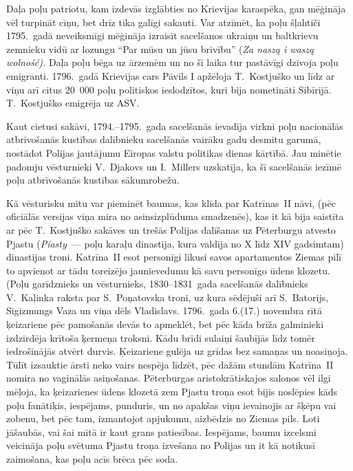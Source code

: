 \documentclass[twoside,a5paper,12pt,fleqn,openany]{extbook}
\newcommand{\pltxti}[1]{\textit{\textpolish{#1}}}
\begin{document}
Daļa poļu patriotu, kam izdevās izglābties no Krievijas karaspēka, gan mēģināja vēl turpināt cīņu, bet drīz tika galīgi sakauti. Var atzīmēt, ka poļu šļahtiči 1795.~gadā neveiksmīgi mēģināja izraisīt sacelšanos ukraiņu un baltkrievu zemnieku vidū ar lozungu ``Par mūsu un jūsu brīvību'' (\pltxti{Za naszą i waszą wolność).} Daļa poļu bēga uz ārzemēm un no šī laika tur pastāvīgi dzīvoja poļu emigranti. 1796.~gadā Krievijas cars Pāvils I apžēloja T.~Kostjuško un līdz ar viņu arī citus 20~000 poļu politiskos ieslodzītos, kuri bija nometināti Sibīrijā. T.~Kostjuško emigrēja uz ASV.

Kaut cietusi sakāvi, 1794.--1795.~gada sacelšanās ievadīja virkni poļu nacionālās atbrīvošanās kustības dalībnieku sacelšanās vairāku gadu desmitu garumā, nostādot Polijas jautājumu Eiropas valstu politikas dienas kārtībā. Jau minētie padomju vēsturnieki V.~Djakovs un I.~Millers uzskatīja, ka šī sacelšanās iezīmē poļu atbrīvošanās kustības sākumrobežu.

Kā vēsturisku mītu var pieminēt baumas, kas klīda par Katrīnas~II nāvi, (pēc oficiālās versijas viņa mira no asinsizplūduma smadzenēs), kas it kā bija saistīta ar pēc T.~Kostjuško sakāves un trešās Polijas dalīšanas uz Pēterburgu atvesto Pjastu (\pltxti{Piasty}~--- poļu karaļu dinastija, kura valdīja no X līdz XIV gadsimtam) dinastijas troni. Katrīna~II esot personīgi likusi savos apartamentos Ziemas pilī to apvienot ar tādu toreizējo jaunievedumu kā savu personīgo ūdens klozetu. (Poļu garīdznieks un vēsturnieks, 1830--1831~gada sacelšanās dalībnieks V.~Kaļinka raksta par S.~Poņatovska troni, uz kura sēdējuši arī S.~Batorijs, Sigizmungs Vaza un viņa dēls Vladislavs. 1796.~gada 6.(17.) novembra rītā ķeizariene pēc pamošanās devās to apmeklēt, bet pēc kāda brīža galminieki izdzirdēja krītoša ķermeņa troksni. Kādu brīdi sulaiņi šaubījās līdz tomēr iedrošinājās atvērt durvis. Ķeizariene gulēja uz grīdas bez samaņas un noasiņoja. Tūlīt izsauktie ārsti neko vairs nespēja līdzēt, pēc dažām stundām Katrīna~II nomira no vaginālās asiņošanas. Pēterburgas aristokrātiskajos salonos vēl ilgi mēļoja, ka ķeizarienes ūdens klozetā zem Pjastu troņa esot bijis noslēpies kāds poļu fanātiķis, iespējams, punduris, un no apakšas viņu ievainojis ar šķēpu vai zobenu, bet pēc tam, izmantojot apjukumu, aizbēdzis no Ziemas pils. Loti jāšaubās, vai šai mītā ir kaut grans patiesības. Iespējams, baumu izcelsmi veicināja poļu svētuma Pjastu troņa izvešana no Polijas un it kā notikusī zaimošana, kas poļu acīs brēca pēc soda.
\end{document}
